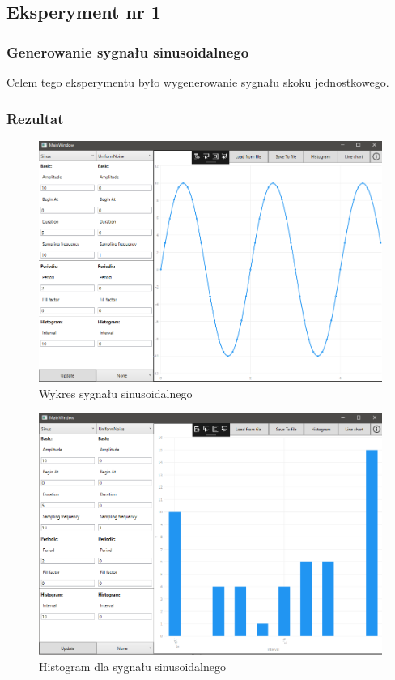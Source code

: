\documentclass[12pt]{article}
\begin{document}
\subsection{Eksperyment nr 1}




\subsubsection{Generowanie sygnału sinusoidalnego}
Celem tego eksperymentu było wygenerowanie sygnału skoku jednostkowego.


\subsubsection{Rezultat}

\begin{figure}[H]
 \centering
 \includegraphics[width=15cm]{images/sin1.PNG}
 \vspace{-0.3cm}
 \caption{Wykres sygnału sinusoidalnego}
 \label{gui}
\end{figure}

\begin{figure}[H]
 \centering
 \includegraphics[width=15cm]{images/sin1hist.PNG}
 \vspace{-0.3cm}
 \caption{Histogram dla sygnału sinusoidalnego}
 \label{gui}
\end{figure}
\end{document}
